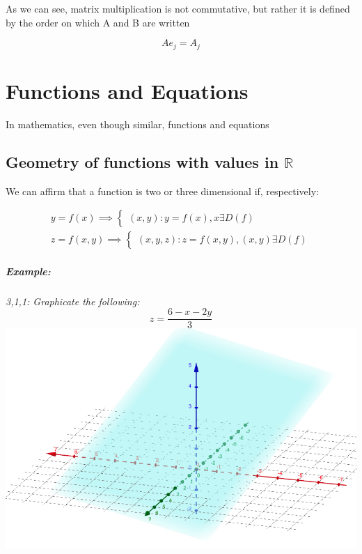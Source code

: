 \documentclass[11pt,fleqn]{book} %
\begin{document}
As we can see, matrix multiplication is not commutative, but rather it is defined
by the order on which A and B are written


$$ Ae_j = A_j $$

\chapter{Functions and Equations}

In mathematics, even though similar, functions and equations 

\section{Geometry of functions with values in $ \mathbb{R} $}

We can affirm that a function is two or three dimensional if, respectively:

\begin{gather}
    y = f(x) \implies \begin{cases}
        (x,y): y = f(x), x \exists D(f)
    \end{cases} \\
    z = f(x,y) \implies \begin{cases} 
    (x,y,z): z = f(x,y), (x,y) \exists D(f)
    \end{cases}
\end{gather}

\pagebreak
\paragraph*{Example:}
\textit{3,1,1: Graphicate the following:}
$$ z = \frac{6-x-2y}{3} $$
\includegraphics[scale = 0.5]{Pictures/plane3,1.png}
\end{document}
